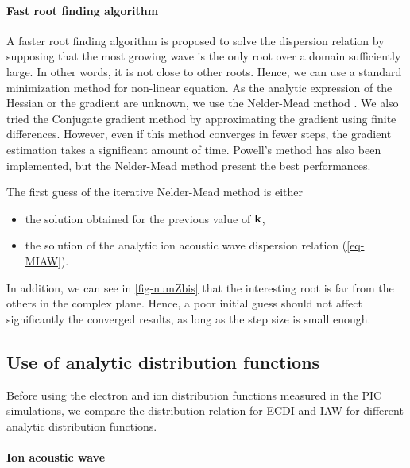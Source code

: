   \paragraph{Fast root finding algorithm\\}
    A faster root finding algorithm is proposed to solve the dispersion relation by supposing that the most growing wave is the only root over a domain sufficiently large.
    In other words, it is not close to other roots.
    Hence, we can use a standard minimization method for non-linear equation.
    As the analytic expression of the Hessian or the gradient are unknown, we use the Nelder-Mead method \citep{mckinnon1998}.
    We also tried the Conjugate gradient method by approximating the gradient using finite differences. 
    However, even if this method converges in fewer steps, the gradient estimation takes a significant amount of time.
    Powell's method \citep{powell1964} has also been implemented, but the Nelder-Mead method present the best performances.
    
    The first guess of the iterative Nelder-Mead method is either 
    \begin{itemize}
      \item the solution obtained for the previous value of ${\mathbf k}$, 
      \item the solution of the analytic ion acoustic wave dispersion relation (\cref{eq-MIAW}).
    \end{itemize}
    In addition, we can see in \cref{fig-numZbis} that the interesting root is far from the others in the complex plane.
    Hence, a poor initial guess should not affect significantly the converged results, as long as the step size is small enough.
    

    \FloatBarrier

\subsection{Use of analytic distribution functions} \label{subsec-DRimpact}
  Before using the electron and ion distribution functions measured in the \ac{PIC} simulations, we compare the distribution relation for \ac{ECDI} and \ac{IAW} for different analytic distribution functions.
  
  \paragraph{Ion acoustic wave\\}
  

